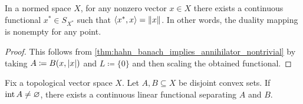 \begin{corollary}\label{thm:hahn_banach_implies_duality_mapping_nonempty}\cite[25]{Йоффе1974}
  In a normed space \( X \), for any nonzero vector \( x \in X \) there exists a continuous functional \( x^* \in S_{X^*} \) such that \( \left\langle x^*, x \right\rangle = \left\Vert x \right\Vert \). In other words, the duality mapping is nonempty for any point.
\end{corollary}
\begin{proof}
  This follows from \cref{thm:hahn_banach_implies_annihilator_nontrivial} by taking \( A \coloneqq B(x, \left\vert x \right\vert) \) and \( L \coloneqq \{ 0 \} \) and then scaling the obtained functional.
\end{proof}

\begin{theorem}\label{thm:hahn_banach_hyperplane_separation}\cite[25]{Йоффе1974}
  Fix a topological vector space \( X \). Let \( A, B \subseteq X \) be disjoint convex sets. If \( \operatorname{int}{A} \neq \varnothing \), there exists a continuous linear functional separating \( A \) and \( B \).
\end{theorem}
